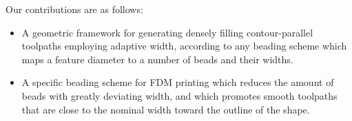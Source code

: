 Our contributions are as follows:
\begin{itemize}
\item A geometric framework for generating densely filling contour-parallel toolpaths employing adaptive width, according to any beading scheme which maps a feature diameter to a number of beads and their widths.
\item A specific beading scheme for FDM printing which reduces the amount of beads with greatly deviating width, and which promotes smooth toolpaths that are close to the nominal width toward the outline of the shape.
\end{itemize}





